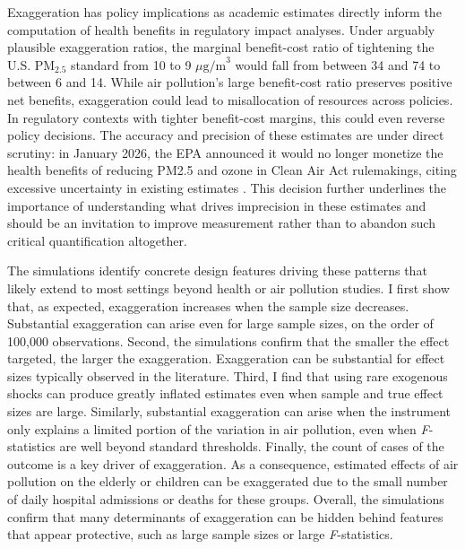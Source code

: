 \documentclass[12pt]{article}
\begin{document}
		Exaggeration has policy implications as academic estimates directly inform the computation of health benefits in regulatory impact analyses. Under arguably plausible exaggeration ratios, the marginal benefit-cost ratio of tightening the U.S. $\text{PM}_{2.5}$ standard from 10 to 9 $\mu\text{g/m}^3$ would fall from between 34 and 74 to between 6 and 14. While air pollution's large benefit-cost ratio preserves positive net benefits, exaggeration could lead to misallocation of resources across policies. In regulatory contexts with tighter benefit-cost margins, this could even reverse policy decisions. The accuracy and precision of these estimates are under direct scrutiny: in January 2026, the EPA announced it would no longer monetize the health benefits of reducing PM2.5 and ozone in Clean Air Act rulemakings, citing excessive uncertainty in existing estimates \citep{u.s.epa_economic_2026}. This decision further underlines the importance of understanding what drives imprecision in these estimates and should be an invitation to improve measurement rather than to abandon such critical quantification altogether.
		
		The simulations identify concrete design features driving these patterns that likely extend to most settings beyond health or air pollution studies. I first show that, as expected, exaggeration increases when the sample size decreases. Substantial exaggeration can arise even for large sample sizes, on the order of 100,000 observations. Second, the simulations confirm that the smaller the effect targeted, the larger the exaggeration. Exaggeration can be substantial for effect sizes typically observed in the literature. Third, I find that using rare exogenous shocks can produce greatly inflated estimates even when sample and true effect sizes are large. Similarly, substantial exaggeration can arise when the instrument only explains a limited portion of the variation in air pollution, even when \textit{F}-statistics are well beyond standard thresholds. Finally, the count of cases of the outcome is a key driver of exaggeration. As a consequence, estimated effects of air pollution on the elderly or children can be exaggerated due to the small number of daily hospital admissions or deaths for these groups. Overall, the simulations confirm that many determinants of exaggeration can be hidden behind features that appear protective, such as large sample sizes or large \textit{F}-statistics.
		 
\end{document}
